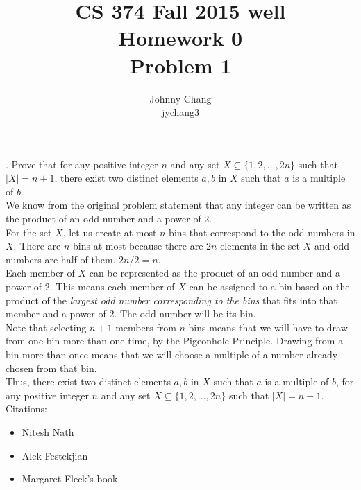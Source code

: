 \documentclass[letterpaper, 10pt]{article}
\begin{document}
\title{CS 374 Fall 2015 well\\
Homework 0\\
Problem 1
}

\author{Johnny Chang \\ jychang3}
\maketitle

. Prove that for any positive integer $n$ and any set $X \subseteq \{1, 2, ..., 2n\}$ such that $|X| = n + 1$, there exist two distinct elements $a, b$ in $X$ such that $a$ is a multiple of $b$.\\

    We know from the original problem statement that any integer can be written as the product of an odd number and a power of 2.\\

    For the set $X$, let us create at most $n$ bins that correspond to the odd numbers in $X$. There are $n$ bins at most because there are $2n$ elements in the set $X$ and odd numbers are half of them. $2n/2 = n$. \\

    Each member of $X$ can be represented as the product of an odd number and a power of 2. This means each member of $X$ can be assigned to a bin based on the product of the \emph{largest odd number corresponding to the bins} that fits into that member and a power of 2. The odd number will be its bin.\\

    Note that selecting $n+1$ members from $n$ bins means that we will have to draw from one bin more than one time, by the Pigeonhole Principle. Drawing from a bin more than once means that we will choose a multiple of a number already chosen from that bin.\\

    Thus, there exist two distinct elements $a, b$ in $X$ such that $a$ is a multiple of $b$, for any positive integer $n$ and any set $X \subseteq \{1, 2, ..., 2n\}$ such that $|X| = n + 1$.\\

    Citations:
    \begin{itemize}
        \item Nitesh Nath
        \item Alek Festekjian
        \item Margaret Fleck's book
    \end{itemize}
\end{document}
